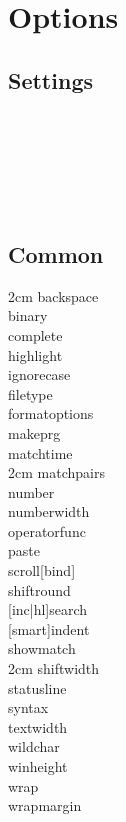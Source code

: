 \section{Options}

\subsection*{Settings}

\\
\\
\\
\\
\\

\subsection*{Common}

\api
{2cm}{
backspace   \\
binary      \\
complete    \\
highlight   \\
ignorecase  \\
filetype    \\
formatoptions\\
makeprg     \\
matchtime   \\
}
{2cm}{
matchpairs  \\
number      \\
numberwidth \\
operatorfunc\\
paste       \\
scroll[bind]\\
shiftround  \\
{[inc|hl]}search\\
{[smart]}indent \\
showmatch   \\
}
{2cm}{
shiftwidth  \\
statusline  \\
syntax      \\
textwidth   \\
wildchar    \\
winheight   \\
wrap        \\
wrapmargin  \\
}
\stopapi

